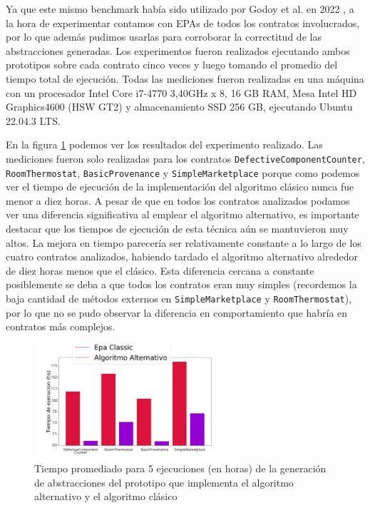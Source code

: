 Ya que este mismo benchmark había sido utilizado por Godoy et al. en 2022 \cite{predicate-abstraction-for-smart-contract-validation}, a la hora de experimentar contamos con EPAs de todos los contratos involucrados, por lo que además pudimos usarlas para corroborar la correctitud de las abstracciones generadas.
Los experimentos fueron realizados ejecutando ambos prototipos sobre cada contrato cinco veces y luego tomando el promedio del tiempo total de ejecución.
Todas las mediciones fueron realizadas en una máquina con un procesador Intel Core i7-4770 \@ 3,40GHz x 8, 16 GB RAM, Mesa Intel HD Graphics4600 (HSW GT2) y almacenamiento SSD 256 GB, ejecutando Ubuntu 22.04.3 LTS.

En la figura \ref{fig:classic-vs-alternativo} podemos ver los resultados del experimento realizado.
Las mediciones fueron solo realizadas para los contratos \texttt{DefectiveComponentCounter}, \texttt{RoomThermostat}, \texttt{BasicProvenance} y \texttt{SimpleMarketplace} porque como podemos ver el tiempo de ejecución de la implementación del algoritmo clásico nunca fue menor a diez horas.
A pesar de que en todos los contratos analizados podamos ver una diferencia significativa al emplear el algoritmo alternativo, es importante destacar que los tiempos de ejecución de esta técnica aún se mantuvieron muy altos.
La mejora en tiempo parecería ser relativamente constante a lo largo de los cuatro contratos analizados, habiendo tardado el algoritmo alternativo alrededor de diez horas menos que el clásico.
Esta diferencia cercana a constante posiblemente se deba a que todos los contratos eran muy simples (recordemos la baja cantidad de métodos externos en \texttt{SimpleMarketplace} y \texttt{RoomThermostat}), por lo que no se pudo observar la diferencia en comportamiento que habría en contratos más complejos.

\begin{figure}[h]
    \centering
    \includegraphics[width=0.65\textwidth]{figs/classic_vs_alternativo.png}
    \caption{Tiempo promediado para 5 ejecuciones (en horas) de la generación de abstracciones del prototipo que implementa el algoritmo alternativo y el algoritmo clásico}
    \label{fig:classic-vs-alternativo}
\end{figure}

